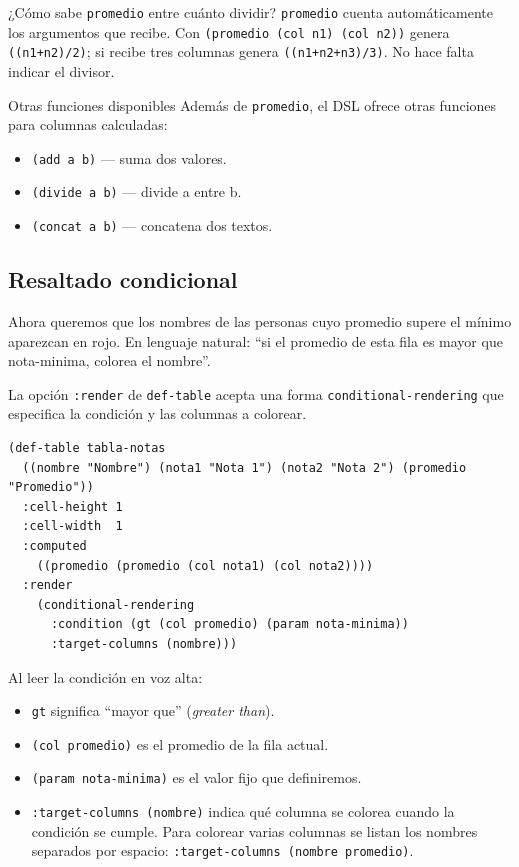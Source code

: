 \documentclass[12pt,a4paper]{report}
\begin{document}
\begin{infobox}{¿Cómo sabe \texttt{promedio} entre cuánto dividir?}
  \texttt{promedio} cuenta automáticamente los argumentos que recibe.
  Con \texttt{(promedio (col n1) (col n2))} genera
  \texttt{((n1+n2)/2)}; si recibe tres columnas genera
  \texttt{((n1+n2+n3)/3)}.  No hace falta indicar el divisor.
\end{infobox}

\begin{infobox}{Otras funciones disponibles}
  Además de \texttt{promedio}, el DSL ofrece otras funciones para
  columnas calculadas:
  \begin{itemize}
    \item \texttt{(add a b)} --- suma dos valores.
    \item \texttt{(divide a b)} --- divide a entre b.
    \item \texttt{(concat a b)} --- concatena dos textos.
  \end{itemize}
\end{infobox}

\subsection{Resaltado condicional}

Ahora queremos que los nombres de las personas cuyo promedio supere el
mínimo aparezcan en rojo.  En lenguaje natural: ``si el promedio de
esta fila es mayor que nota-minima, colorea el nombre''.

La opción \texttt{:render} de \texttt{def-table} acepta una forma
\texttt{conditional-rendering} que especifica la condición y las
columnas a colorear.

\begin{lstlisting}[caption={Tabla con columna calculada y resaltado.}]
(def-table tabla-notas
  ((nombre "Nombre") (nota1 "Nota 1") (nota2 "Nota 2") (promedio "Promedio"))
  :cell-height 1
  :cell-width  1
  :computed
    ((promedio (promedio (col nota1) (col nota2))))
  :render
    (conditional-rendering
      :condition (gt (col promedio) (param nota-minima))
      :target-columns (nombre)))
\end{lstlisting}

\noindent Al leer la condición en voz alta:

\begin{itemize}
  \item \texttt{gt} significa ``mayor que'' (\emph{greater than}).
  \item \texttt{(col promedio)} es el promedio de la fila actual.
  \item \texttt{(param nota-minima)} es el valor fijo que definiremos.
  \item \texttt{:target-columns (nombre)} indica qué columna se colorea
    cuando la condición se cumple.  Para colorear varias columnas se
    listan los nombres separados por espacio:
    \texttt{:target-columns (nombre promedio)}.
\end{itemize}
\end{document}
